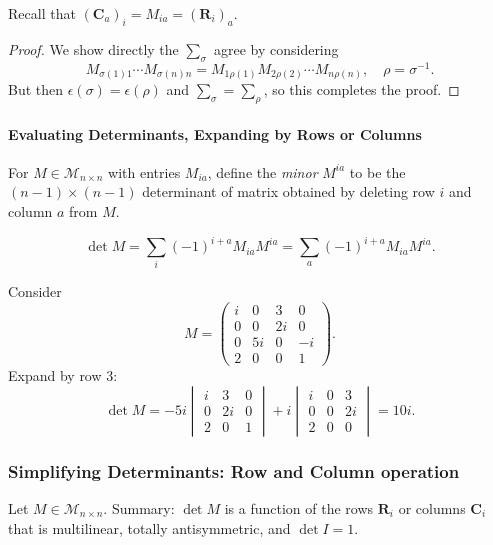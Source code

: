 \documentclass[a4paper]{article}
\begin{document}
    Recall that $ (\mathbf{C}_{a})_i=M_{ia}=(\mathbf{R}_{i})_a $.
    \begin{proof}
      We show directly the $ \sum_\sigma $ agree by considering
      \[
        M_{\sigma(1)1}\cdots M_{\sigma(n)n} =
        M_{1\rho(1)}M_{2\rho(2)}\cdots M_{n\rho(n)},\quad \rho=\sigma^{-1}.
      \]
      But then $ \epsilon(\sigma)=\epsilon(\rho) $ and $
      \sum_\sigma=\sum_\rho $, so this completes the proof.
    \end{proof}
    \paragraph{Evaluating Determinants, Expanding by Rows or Columns}
    \begin{definition}
      For $ M\in \mathcal{M}_{n\times n} $ with entries $M_{ia}$,
      define the \textit{minor} $ M^{ia} $ to be the $ (n-1)\times
      (n-1) $ determinant of matrix obtained by deleting row $i$ and
      column $a$ from $M$.
    \end{definition}
    \begin{proposition}
      \[
        \det M = \sum_{i}(-1)^{i+a}M_{ia}M^{ia} = \sum_{a}(-1)^{i+a}M_{ia}M^{ia}
      .\]
    \end{proposition}
    \begin{example}
      Consider
      \[
        M=
        \begin{pmatrix}
          i&0&3&0\\
          0&0&2i&0\\
          0&5i&0&-i\\
          2&0&0&1
        \end{pmatrix}
      .\]
      Expand by row 3:
      \[
        \det M=-5i
        \begin{vmatrix}
          i&3&0\\
          0&2i&0\\
          2&0&1
        \end{vmatrix}+i
        \begin{vmatrix}
          i&0&3\\
          0&0&2i\\
          2&0&0
        \end{vmatrix}
        = 10i.
      \]
    \end{example}
    \subsubsection{Simplifying Determinants: Row and Column operation}
    Let $ M\in \mathcal{M}_{n\times n} $. Summary: $ \det M $ is a
    function of the rows $ \mathbf{R}_i $ or columns $ \mathbf{C}_i $
    that is multilinear, totally antisymmetric, and $ \det I = 1 $.
\end{document}
